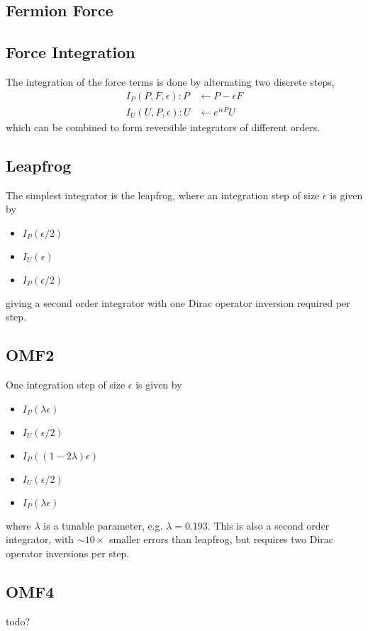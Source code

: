 \documentclass[a4paper,12pt]{article}
\begin{document}
\subsection{Fermion Force}

\subsection{Force Integration}
The integration of the force terms is done by alternating two discrete steps,
\begin{align}
  I_P(P, F, \epsilon): P & \leftarrow P - \epsilon F \\
  I_U(U, P, \epsilon): U & \leftarrow e^{i \epsilon P} U
\end{align}
which can be combined to form reversible integrators of different orders.
\subsection{Leapfrog}
The simplest integrator is the leapfrog, where an integration step of size $\epsilon$ is given by
\begin{itemize}
 \item $I_P(\epsilon/2)$
 \item $I_U(\epsilon)$
 \item $I_P(\epsilon/2)$
\end{itemize}
giving a second order integrator with one Dirac operator inversion required per step.

\subsection{OMF2}
One integration step of size $\epsilon$ is given by
\begin{itemize}
 \item $I_P(\lambda \epsilon)$
 \item $I_U(\epsilon/2)$
 \item $I_P((1-2\lambda) \epsilon)$
 \item $I_U(\epsilon/2)$
 \item $I_P(\lambda \epsilon)$
\end{itemize}
where $\lambda$ is a tunable parameter, e.g. $\lambda = 0.193$. This is also a second order integrator, 
with $\sim10\times$ smaller errors than leapfrog, but requires two Dirac operator inversions per step.

\subsection{OMF4}
todo?
\end{document}
